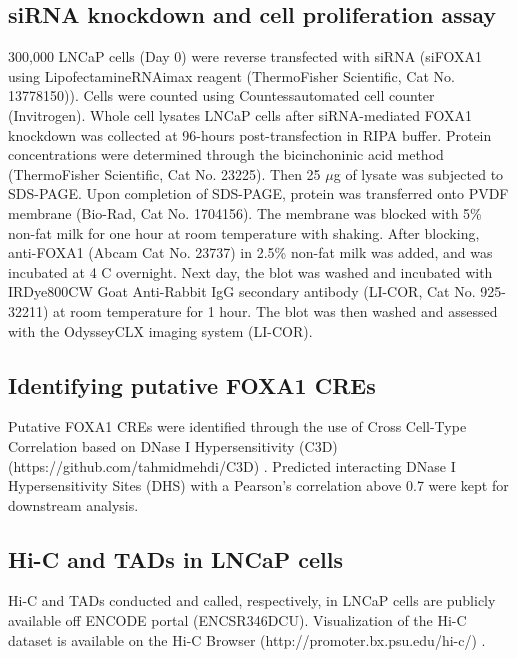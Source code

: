 \subsection{siRNA knockdown and cell proliferation assay}

300,000 LNCaP cells (Day 0) were reverse transfected with siRNA (siFOXA1 using Lipofectamine\textregistered RNAimax reagent (ThermoFisher Scientific, Cat No. 13778150)).
Cells were counted using Countess\texttrademark automated cell counter (Invitrogen).
Whole cell lysates LNCaP cells after siRNA-mediated FOXA1 knockdown was collected at 96-hours post-transfection in RIPA buffer.
Protein concentrations were determined through the bicinchoninic acid method (ThermoFisher Scientific, Cat No. 23225).
Then 25 $\mu$g of lysate was subjected to SDS-PAGE.
Upon completion of SDS-PAGE, protein was transferred onto PVDF membrane (Bio-Rad, Cat No. 1704156).
The membrane was blocked with 5\% non-fat milk for one hour at room temperature with shaking.
After blocking, anti-FOXA1 (Abcam Cat No. 23737) in 2.5\% non-fat milk was added, and was incubated at 4 \textdegree C overnight.
Next day, the blot was washed and incubated with IRDye\textregistered 800CW Goat Anti-Rabbit IgG secondary antibody (LI-COR, Cat No. 925-32211) at room temperature for 1 hour.
The blot was then washed and assessed with the Odyssey\textregistered CLX imaging system (LI-COR).

\subsection{Identifying putative FOXA1 CREs}

Putative FOXA1 CREs were identified through the use of Cross Cell-Type Correlation based on DNase I Hypersensitivity (C3D) (https://github.com/tahmidmehdi/C3D) \cite{mehdiC3DToolPredict2019}.
Predicted interacting DNase I Hypersensitivity Sites (DHS) with a Pearson's correlation above 0.7 \cite{thurmanAccessibleChromatinLandscape2012} were kept for downstream analysis.

\subsection{Hi-C and TADs in LNCaP cells}

Hi-C and TADs conducted and called, respectively, in LNCaP cells are publicly available off ENCODE portal (ENCSR346DCU).
Visualization of the Hi-C dataset is available on the Hi-C Browser (http://promoter.bx.psu.edu/hi-c/) \cite{wang3DGenomeBrowser2018}.

